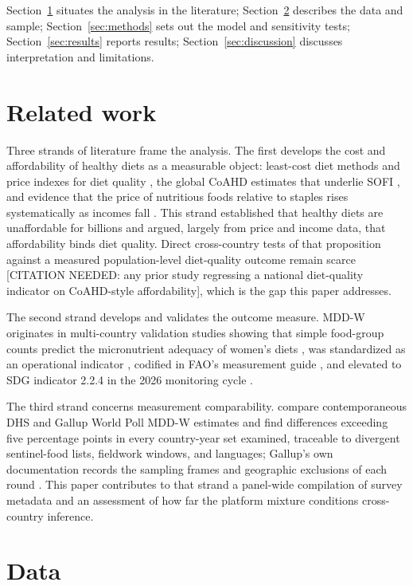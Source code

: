 \documentclass[11pt]{article}
\begin{document}
Section~\ref{sec:related} situates the analysis in the literature; Section~\ref{sec:data} describes the data and sample; Section~\ref{sec:methods} sets out the model and sensitivity tests; Section~\ref{sec:results} reports results; Section~\ref{sec:discussion} discusses interpretation and limitations.

\section{Related work}\label{sec:related}

Three strands of literature frame the analysis. The first develops the cost and affordability of healthy diets as a measurable object: least-cost diet methods and price indexes for diet quality \citep{masters2018}, the global CoAHD estimates that underlie SOFI \citep{herforth2020, bai2021}, and evidence that the price of nutritious foods relative to staples rises systematically as incomes fall \citep{headey2019}. This strand established that healthy diets are unaffordable for billions and argued, largely from price and income data, that affordability binds diet quality. Direct cross-country tests of that proposition against a measured population-level diet-quality outcome remain scarce [CITATION NEEDED: any prior study regressing a national diet-quality indicator on CoAHD-style affordability], which is the gap this paper addresses.

The second strand develops and validates the outcome measure. MDD-W originates in multi-country validation studies showing that simple food-group counts predict the micronutrient adequacy of women's diets \citep{arimond2010}, was standardized as an operational indicator \citep{martinprevel2015}, codified in FAO's measurement guide \citep{fao2021}, and elevated to SDG indicator 2.2.4 in the 2026 monitoring cycle \citep{fao2026}.

The third strand concerns measurement comparability. \citet{hanleycook2025} compare contemporaneous DHS and Gallup World Poll MDD-W estimates and find differences exceeding five percentage points in every country-year set examined, traceable to divergent sentinel-food lists, fieldwork windows, and languages; Gallup's own documentation records the sampling frames and geographic exclusions of each round \citep{gallup2024, gdqp}. This paper contributes to that strand a panel-wide compilation of survey metadata and an assessment of how far the platform mixture conditions cross-country inference.

\section{Data}\label{sec:data}
\end{document}
